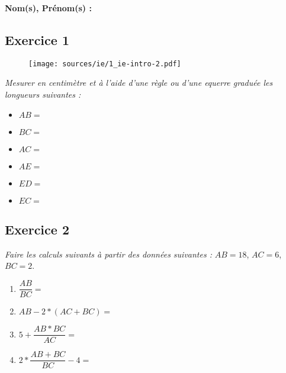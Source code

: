 \documentclass[13pt]{article}
\begin{document}
\noindent\hrulefill

\textbf{Nom(s), Prénom(s) :}

\begin{multicols}{2}

  \subsection*{Exercice 1}

  \begin{figure}[H]
    \centering
    \texttt{[image: sources/ie/1\_ie-intro-2.pdf]}
  \end{figure}

  \textit{Mesurer en centimètre et à l'aide d'une règle ou d'une equerre graduée les longueurs suivantes :}\\

  \begin{itemize}
  \item $AB = $\\
  \item $BC = $\\
  \item $AC = $\\
  \item $AE = $\\
  \item $ED = $\\
  \item $EC = $\\
  \end{itemize}

\end{multicols}

\subsection*{Exercice 2}

\textit{Faire les calculs suivants à partir des données suivantes :}  $AB = 18$, $AC = 6$, $BC = 2$.

\begin{enumerate}
\item $\dfrac{AB}{BC} = $\\
\item $AB - 2*(AC + BC) = $\\
\item $5 + \dfrac{AB * BC}{AC} = $\\
\item $2 * \dfrac{AB + BC}{BC} - 4= $\\
\end{enumerate}
\end{document}
